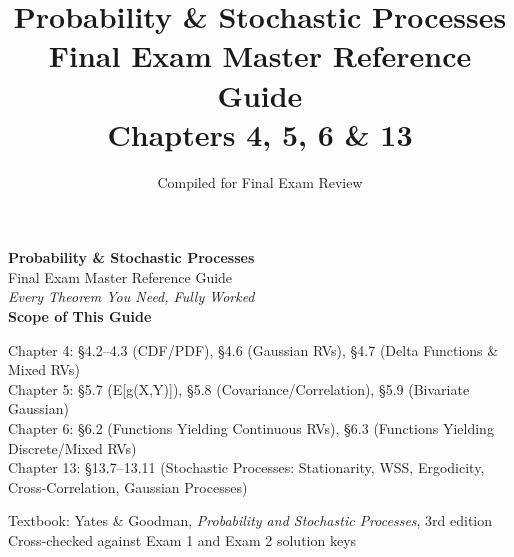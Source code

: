 \documentclass[11pt]{article}
\title{\Huge\textbf{Probability \& Stochastic Processes}\\[6pt]
\Large Final Exam Master Reference Guide\\[4pt]
\large Chapters 4, 5, 6 \& 13}
\author{}
\date{Compiled for Final Exam Review}
\begin{document}
\begin{titlepage}
\centering
\vspace*{2cm}
{\Huge\bfseries Probability \& Stochastic Processes}\\[10pt]
{\LARGE Final Exam Master Reference Guide}\\[6pt]
{\Large\itshape Every Theorem You Need, Fully Worked}\\[40pt]

{\large\bfseries Scope of This Guide}\\[8pt]
\begin{minipage}{0.82\linewidth}
\centering
Chapter 4: \S4.2--4.3 (CDF/PDF), \S4.6 (Gaussian RVs), \S4.7 (Delta Functions \& Mixed RVs)\\[4pt]
Chapter 5: \S5.7 (E[g(X,Y)]), \S5.8 (Covariance/Correlation), \S5.9 (Bivariate Gaussian)\\[4pt]
Chapter 6: \S6.2 (Functions Yielding Continuous RVs), \S6.3 (Functions Yielding Discrete/Mixed RVs)\\[4pt]
Chapter 13: \S13.7--13.11 (Stochastic Processes: Stationarity, WSS, Ergodicity, Cross-Correlation, Gaussian Processes)\\[10pt]
\end{minipage}

\vspace{25pt}

\vfill
{\large Textbook: Yates \& Goodman, \textit{Probability and Stochastic Processes}, 3rd edition}\\[4pt]
{\normalsize Cross-checked against Exam 1 and Exam 2 solution keys}
\vspace{1cm}
\end{titlepage}

\clearpage
\tableofcontents
\clearpage
{}
\end{document}
